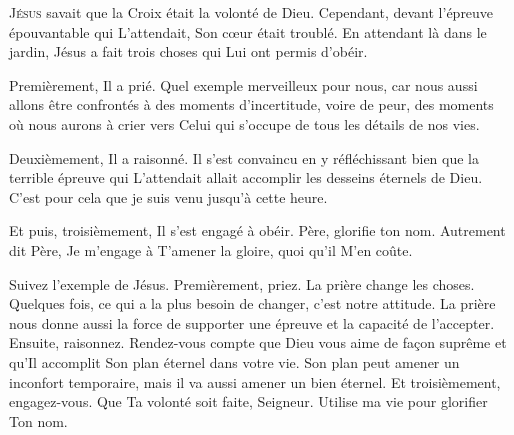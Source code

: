 \dvrule







\lettrine{J}{ésus} savait que la Croix était la volonté de Dieu.
 Cependant, devant l'épreuve épouvantable qui L'attendait,
 Son c\oe{}ur était troublé. En attendant là dans le jardin,
 Jésus a fait trois choses qui Lui ont permis d'obéir.

Premièrement, Il a prié. Quel exemple merveilleux pour nous,
 car nous aussi allons être confrontés à des moments d'incertitude,
 voire de peur, des moments où nous aurons à crier vers Celui
 qui s'occupe de tous les détails de nos vies.


Deuxièmement, Il a raisonné. Il s'est convaincu en y réfléchissant
 bien que la terrible épreuve qui L'attendait allait accomplir
 les desseins éternels de Dieu.
 \Og C'est pour cela que je suis venu jusqu'à cette heure. \Fg{}

Et puis, troisièmement, Il s'est engagé à obéir.
 \Og Père, glorifie ton nom. \Fg{}
 Autrement dit\frcolon{} 
 \Og Père, Je m'engage à T'amener la gloire, quoi qu'il M'en coûte. \Fg{}

Suivez l'exemple de Jésus. Premièrement, priez.
 La prière change les choses. Quelques fois, 
 ce qui a la plus besoin de changer, c'est notre attitude.
 La prière nous donne aussi la force de supporter une épreuve
 et la capacité de l'accepter. Ensuite, raisonnez. 
 Rendez-vous compte que Dieu vous aime de fa\c{c}on suprême et qu'Il accomplit
 Son plan éternel dans votre vie.
 Son plan peut amener un inconfort temporaire, mais il va aussi amener
 un bien éternel. Et troisièmement, engagez-vous.
 \Og Que Ta volonté soit faite, Seigneur.
 Utilise ma vie pour glorifier Ton nom. \Fg{}

